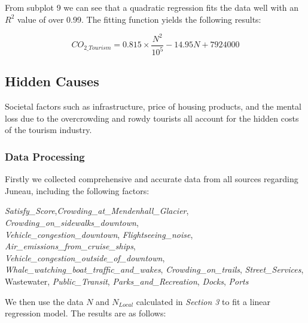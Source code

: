 \begin{figure}[H]
\begin{minipage}{0.33\textwidth}
    \end{minipage}
\end{figure}

From subplot 9 we can see that a quadratic regression 
fits the data well with an $R^2$ value of over 0.99.
The fitting function yields the following results:

\begin{equation}
    CO_{2\_Tourism} = 0.815 \times \frac{N^2}{10^5} - 14.95N+7924000
\end{equation}



\subsection{Hidden Causes}

Societal factors such as infrastructure, price of housing products, and the mental
loss due to the overcrowding and rowdy tourists all account for the hidden costs of the tourism industry.

\subsubsection{Data Processing}

Firstly we collected comprehensive and accurate data from all sources regarding Juneau, including the following factors:

\textit{Satisfy\_Score},\textit{Crowding\_at\_Mendenhall\_Glacier}, \textit{Crowding\_on\_sidewalks\_downtown}, \\ \textit{Vehicle\_congestion\_downtown}, \textit{Flightseeing\_noise}, \textit{Air\_emissions\_from\_cruise\_ships},\\ \textit{Vehicle\_congestion\_outside\_of\_downtown}, 
\textit{Whale\_watching\_boat\_traffic\_and\_wakes}, \textit{Crowding\_on\_trails}, \textit{Street\_Services}, Wastewater, \textit{Public\_Transit}, \textit{Parks\_and\_Recreation}, 
\textit{Docks}, \textit{Ports}

We then use the data $N$ and $N_{Local}$ calculated in \textit{Section 3} to fit a linear regression model. The results are as follows:

